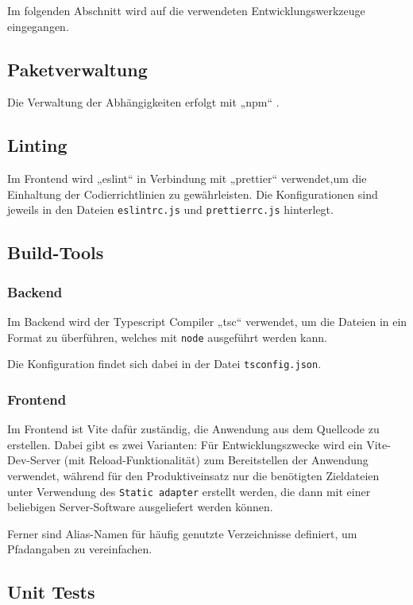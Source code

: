 \documentclass[a4paper, 10pt, conference]{IEEEtran}
\begin{document}
Im folgenden Abschnitt wird auf die verwendeten Entwicklungswerkzeuge eingegangen.

\subsection{Paketverwaltung}

Die Verwaltung der Abhängigkeiten erfolgt mit „npm“ \cite{npm}.

\subsection{Linting}

Im Frontend wird „eslint“ in Verbindung mit „prettier“ verwendet,um die Einhaltung der Codierrichtlinien zu gewährleisten.
Die Konfigurationen sind jeweils in den Dateien \texttt{eslintrc.js} und \texttt{prettierrc.js} hinterlegt.

\subsection{Build-Tools}

\subsubsection{Backend}

Im Backend wird der Typescript Compiler „tsc“ verwendet, um die Dateien in ein Format zu überführen,
welches mit \texttt{node} ausgeführt werden kann.

Die Konfiguration findet sich dabei in der Datei \texttt{tsconfig.json}.

\subsubsection{Frontend}
Im Frontend ist Vite dafür zuständig, die Anwendung aus dem Quellcode zu erstellen. Dabei gibt es zwei Varianten:
Für Entwicklungszwecke wird ein Vite-Dev-Server (mit Reload-Funktionalität) zum Bereitstellen der Anwendung verwendet,
während für den Produktiveinsatz nur die benötigten Zieldateien unter Verwendung des \texttt{Static adapter} erstellt werden, die dann mit einer beliebigen Server-Software ausgeliefert werden können. 

Ferner sind Alias-Namen für häufig genutzte Verzeichnisse definiert, um Pfadangaben zu vereinfachen.

\subsection{Unit Tests}
\end{document}
